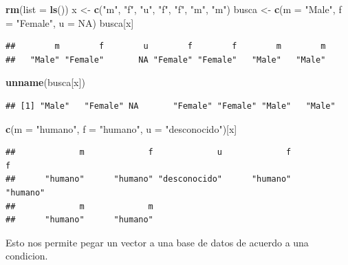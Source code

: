 \documentclass[]{article}
\newenvironment{Shaded}{\begin{snugshade}}{\end{snugshade}}
\newcommand{\KeywordTok}[1]{\textcolor[rgb]{0.13,0.29,0.53}{\textbf{{#1}}}}
\newcommand{\DataTypeTok}[1]{\textcolor[rgb]{0.13,0.29,0.53}{{#1}}}
\newcommand{\StringTok}[1]{\textcolor[rgb]{0.31,0.60,0.02}{{#1}}}
\newcommand{\OtherTok}[1]{\textcolor[rgb]{0.56,0.35,0.01}{{#1}}}
\newcommand{\NormalTok}[1]{{#1}}
\begin{document}
\begin{Shaded}
\begin{Highlighting}[]
\KeywordTok{rm}\NormalTok{(}\DataTypeTok{list =} \KeywordTok{ls}\NormalTok{())}
\NormalTok{x <-}\StringTok{ }\KeywordTok{c}\NormalTok{(}\StringTok{"m"}\NormalTok{, }\StringTok{"f"}\NormalTok{, }\StringTok{"u"}\NormalTok{, }\StringTok{"f"}\NormalTok{, }\StringTok{"f"}\NormalTok{, }\StringTok{"m"}\NormalTok{, }\StringTok{"m"}\NormalTok{)}
\NormalTok{busca <-}\StringTok{ }\KeywordTok{c}\NormalTok{(}\DataTypeTok{m =} \StringTok{"Male"}\NormalTok{, }\DataTypeTok{f =} \StringTok{"Female"}\NormalTok{, }\DataTypeTok{u =} \OtherTok{NA}\NormalTok{)}
\NormalTok{busca[x]}
\end{Highlighting}
\end{Shaded}

\begin{verbatim}
##        m        f        u        f        f        m        m 
##   "Male" "Female"       NA "Female" "Female"   "Male"   "Male"
\end{verbatim}

\begin{Shaded}
\begin{Highlighting}[]
\KeywordTok{unname}\NormalTok{(busca[x])}
\end{Highlighting}
\end{Shaded}

\begin{verbatim}
## [1] "Male"   "Female" NA       "Female" "Female" "Male"   "Male"
\end{verbatim}

\begin{Shaded}
\begin{Highlighting}[]
\KeywordTok{c}\NormalTok{(}\DataTypeTok{m =} \StringTok{"humano"}\NormalTok{, }\DataTypeTok{f =} \StringTok{"humano"}\NormalTok{, }\DataTypeTok{u =} \StringTok{"desconocido"}\NormalTok{)[x]}
\end{Highlighting}
\end{Shaded}

\begin{verbatim}
##             m             f             u             f             f 
##      "humano"      "humano" "desconocido"      "humano"      "humano" 
##             m             m 
##      "humano"      "humano"
\end{verbatim}

Esto nos permite pegar un vector a una base de datos de acuerdo a una
condicion.
\end{document}
